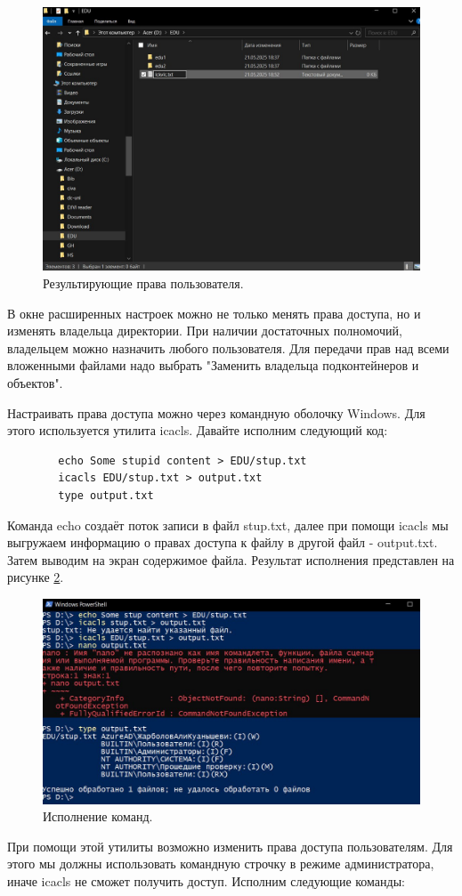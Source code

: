 \begin{figure}
    \centering
    \includegraphics[width=0.5\linewidth]{Pic/lab2/photo_2025-05-21_21-18-42.jpg}
    \caption{Результирующие права пользователя.}
    \label{fig:AccesResult}
\end{figure}

В окне расширенных настроек можно не только менять права доступа, но и изменять владельца директории. При наличии достаточных полномочий, владельцем можно назначить любого пользователя. Для передачи прав над всеми вложенными файлами надо выбрать "Заменить владельца подконтейнеров и объектов".

Настраивать права доступа можно через командную оболочку Windows. Для этого используется утилита icacls. Давайте исполним следующий код:
\begin{verbatim}
        echo Some stupid content > EDU/stup.txt
        icacls EDU/stup.txt > output.txt
        type output.txt
\end{verbatim}
Команда echo создаёт поток записи в файл stup.txt, далее  при помощи icacls мы выгружаем информацию о правах доступа к файлу в другой файл - output.txt. Затем выводим на экран содержимое файла. Результат исполнения представлен на рисунке \ref{fig:icacls}.

\begin{figure}
    \centering
    \includegraphics[width=0.5\linewidth]{Pic/lab2/photo_2025-05-21_21-18-46.jpg}
    \caption{Исполнение команд.}
    \label{fig:icacls}
\end{figure}

При помощи этой утилиты возможно изменить права доступа пользователям. Для этого мы должны использовать командную строчку в режиме администратора, иначе icacls не сможет получить доступ. Исполним следующие команды:

